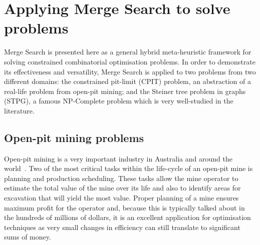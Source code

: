 \documentclass[authoryear,11pt,square,number,times,super,comma]{elsarticle}
\begin{document}


\section{Applying Merge Search to solve problems}
Merge Search is presented here as a general hybrid meta-heuristic framework for solving constrained combinatorial optimisation problems. In order to demonstrate its effectiveness and versatility, Merge Search is applied to two problems from two different domains: the constrained pit-limit (CPIT) problem, an abstraction of a real-life problem from open-pit mining; and the Steiner tree problem in graphs (STPG), a famous NP-Complete problem which is very well-studied in the literature.

\subsection{Open-pit mining problems}
Open-pit mining is a very important industry in Australia and around the world~\citep{singh}. Two of the most critical tasks within the life-cycle of an open-pit mine is planning and production scheduling. These tasks allow the mine operator to estimate the total value of the mine over its life and also to identify areas for excavation that will yield the most value. Proper planning of a mine ensures maximum profit for the operator and, because this is typically talked about in the hundreds of millions of dollars, it is an excellent application for optimisation techniques as very small changes in efficiency can still translate to significant sums of money.\par
\end{document}
